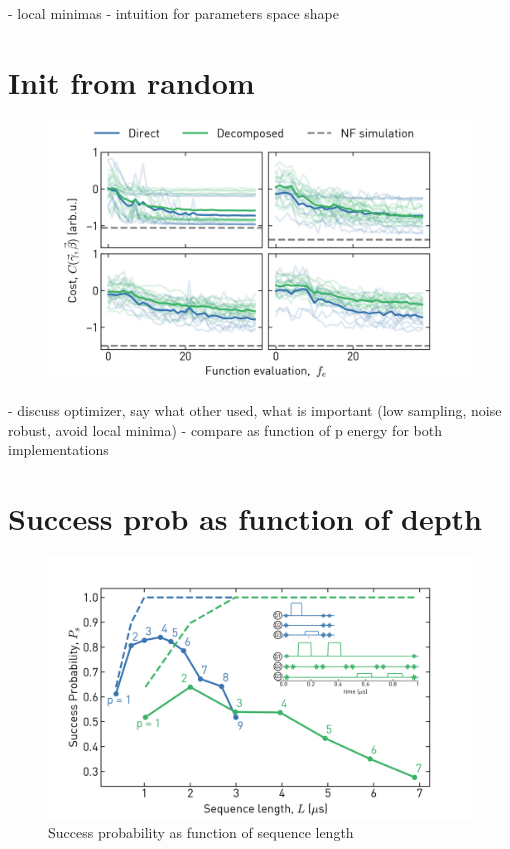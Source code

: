- local minimas
- intuition for parameters space shape

\section{Init from random} \label{sec:qaoa_random_init}
\begin{figure}[ht]
    \centering
    \includegraphics[width=\textwidth]{chapters/qaoa/figs/ch5_qaoa_optimization_traces_20200116_165916.png}
    \caption{}
    \label{fig:qaoa_optimization_traces}
\end{figure}
- discuss optimizer, say what other used, what is important (low sampling, noise robust, avoid local minima)
- compare as function of p energy for both implementations

\section{Success prob as function of depth}


\begin{figure}[ht]
    \centering
    \includegraphics[width=\textwidth]{chapters/qaoa/figs/ch5_qaoa_sequence_lengths_v1_withinset_20200202_120000.png}
    \caption{Success probability as function of sequence length}
    \label{fig:qaoa_sequence_lengths}
\end{figure}

